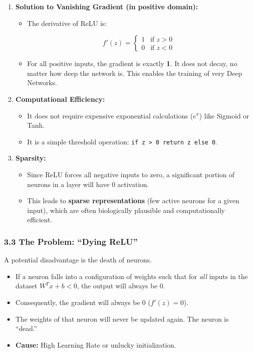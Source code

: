 \documentclass[
  italian,
  11pt,
]{article}
\begin{document}
\begin{enumerate}
\def\labelenumi{\arabic{enumi}.}
\item
  \textbf{Solution to Vanishing Gradient (in positive domain):}

  \begin{itemize}
  \item
    The derivative of ReLU is:

    \[f'(z) = \begin{cases} 1 & \text{if } z > 0 \\ 0 & \text{if } z < 0 \end{cases}\]
  \item
    For all positive inputs, the gradient is exactly \textbf{1}. It does
    not decay, no matter how deep the network is. This enables the
    training of very Deep Networks.
  \end{itemize}
\item
  \textbf{Computational Efficiency:}

  \begin{itemize}
  \item
    It does not require expensive exponential calculations (\(e^x\))
    like Sigmoid or Tanh.
  \item
    It is a simple threshold operation:
    \texttt{if\ z\ \textgreater{}\ 0\ return\ z\ else\ 0}.
  \end{itemize}
\item
  \textbf{Sparsity:}

  \begin{itemize}
  \item
    Since ReLU forces all negative inputs to zero, a significant portion
    of neurons in a layer will have 0 activation.
  \item
    This leads to \textbf{sparse representations} (few active neurons
    for a given input), which are often biologically plausible and
    computationally efficient.
  \end{itemize}
\end{enumerate}

\subsubsection{3.3 The Problem: ``Dying
ReLU''}\label{the-problem-dying-relu}

A potential disadvantage is the death of neurons.

\begin{itemize}
\item
  If a neuron falls into a configuration of weights such that for
  \emph{all} inputs in the dataset \(W^T x + b < 0\), the output will
  always be 0.
\item
  Consequently, the gradient will always be 0 (\(f'(z)=0\)).
\item
  The weights of that neuron will never be updated again. The neuron is
  ``dead.''
\item
  \textbf{Cause:} High Learning Rate or unlucky initialization.
\end{itemize}
\end{document}
